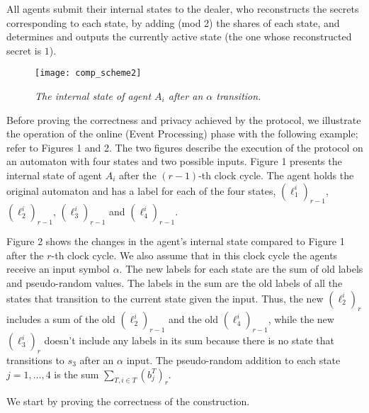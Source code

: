 \documentclass[letterpaper,11pt]{article}
\begin{document}
\vspace{.1in}
  All agents submit their internal states to the
dealer, who reconstructs the secrets  corresponding to each state, by 
adding (mod 2) the shares of each state, and determines and outputs 
the currently active state (the one whose reconstructed secret is $1$).



\begin{figure*} [ht]
\begin{center}
\texttt{[image: comp\_scheme2]}
\caption{\sl The internal state of agent $A_i$ after an $\alpha$ transition.}
\end{center}
\label{fig:comp_scheme2}
\end{figure*}

\vspace{.1in}
Before proving the correctness and privacy achieved by the protocol, 
we illustrate the operation of the online (Event Processing) phase
with the following example;
refer to Figures 1
and 2.
The two figures describe the execution of the
protocol
on an automaton with four states and two possible
inputs. 
Figure 1 presents the 
internal state of agent $A_i$ after the $(r-1)$-th clock cycle. 
The agent holds the original automaton and has a label for each of 
the four states, 
$(\ell^i_1)_{r-1}$, $(\ell^i_2)_{r-1}$, $(\ell^i_3)_{r-1}$ and
$(\ell^i_4)_{r-1}$.



Figure 2
shows the changes in the agent's internal state compared to Figure 1
after the $r$-th clock cycle. We also assume
that in this clock cycle the agents receive an input symbol
$\alpha$. The new labels for each state are the sum of old labels and
pseudo-random values. The labels in the sum are the old labels of
all the states that transition to the current state given the
input. Thus, the new $(\ell_2^i)_r$ includes a sum of the old
$(\ell^i_2)_{r-1}$ and the old $(\ell^i_4)_{r-1}$, while the new
$(\ell_3^i)_r$ doesn't include any labels in its sum because there is
no state that transitions to $s_3$ after an $\alpha$ input. The 
pseudo-random addition to each state $j=1,\ldots,4$ is the sum $\sum_{T, i
\in T} (b_j^T)_{r}$.


We start by proving  the correctness of the construction.
\end{document}
